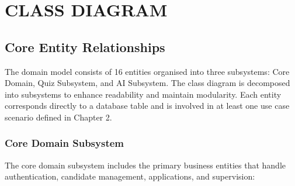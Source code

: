 \section{CLASS DIAGRAM}

\subsection{Core Entity Relationships}
The domain model consists of 16 entities organised into three subsystems: Core Domain, Quiz Subsystem, and AI Subsystem. The class diagram is decomposed into subsystems to enhance readability and maintain modularity. Each entity corresponds directly to a database table and is involved in at least one use case scenario defined in Chapter 2.

\subsubsection{Core Domain Subsystem}
The core domain subsystem includes the primary business entities that handle authentication, candidate management, applications, and supervision:

